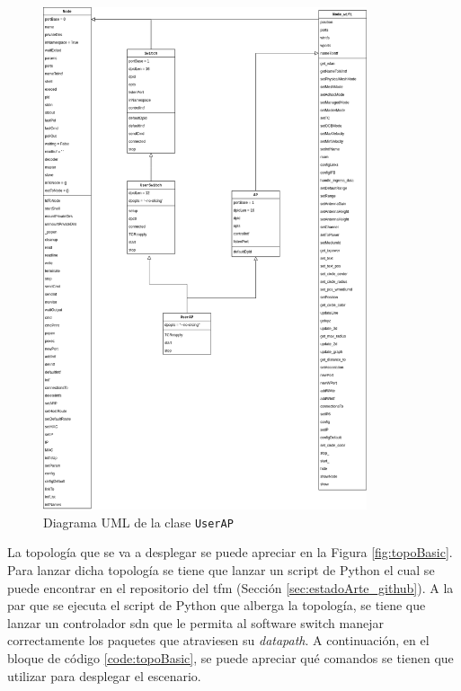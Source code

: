 \begin{figure}[ht!]
    \centering
    \includegraphics[width=0.85\textwidth]{archivos/img/analisis/userAP.png}
    \caption{Diagrama UML de la clase \texttt{UserAP}}
    \label{fig:userAP}
\end{figure}

\newpage


La topología que se va a desplegar se puede apreciar en la Figura \ref{fig:topoBasic}. Para lanzar dicha topología se tiene que lanzar un script de Python el cual se puede encontrar en el repositorio del \gls{tfm} (Sección \ref{sec:estadoArte_github}). A la par que se ejecuta el script de Python que alberga la topología, se tiene que lanzar un controlador \gls{sdn} que le permita al software switch manejar correctamente los paquetes que atraviesen su \textit{datapath}. A continuación, en el bloque de código \ref{code:topoBasic}, se puede apreciar qué comandos se tienen que utilizar para  desplegar el escenario.


